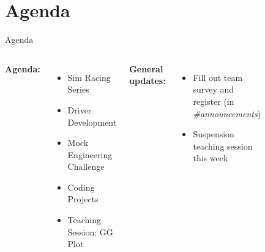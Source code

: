 \section*{Agenda}
\begin{frame}{Agenda}
    \begin{columns}
        \textbf{Agenda:}
        \begin{itemize}
            \item Sim Racing Series
            \item Driver Development
            \item Mock Engineering Challenge
            \item Coding Projects
            \item Teaching Session: GG Plot
        \end{itemize}
        \vspace{2ex}
        \textbf{General updates:}
        \begin{itemize}
            \item Fill out team survey and register
            (in \textit{\#announcements})
            \item Suspension teaching session this week
        \end{itemize}
        \begin{figure}
            \includegraphics[width=\textwidth]{../../res/car/FSUK Cornering.jpg}

\end{figure}
\end{columns}
\end{frame}
